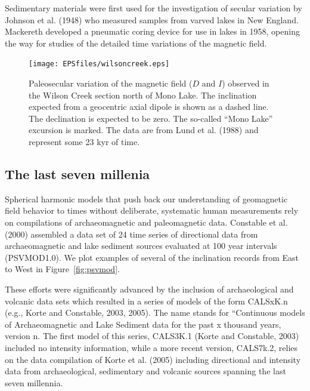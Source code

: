 Sedimentary materials were first used  for the investigation of secular variation   by  
Johnson et al. (1948) \nocite{johnson48} who measured samples from varved lakes in New England.   Mackereth developed a pneumatic coring device for use in  lakes in 1958, opening the way for studies of the detailed time variations of the magnetic field.  
 
\begin{figure}[htb]
\centering  \texttt{[image: EPSfiles/wilsoncreek.eps]}
\caption{ Paleosecular variation of the magnetic field ($D$ and $I$)
observed in the Wilson Creek section north of Mono Lake.  The inclination expected from a geocentric axial dipole is shown as a dashed line.  The declination is
expected to be zero.  The so-called ``Mono
 Lake'' excursion is
marked. The data are from
 Lund et al. (1988) and represent some 23 kyr of time. }
\label{fig:lund}
\end{figure} \nocite{lund88}



\subsection{The last seven millenia}  

Spherical harmonic models  that push back our understanding of geomagnetic field behavior to times without deliberate, systematic human measurements rely on compilations of archaeomagnetic and paleomagnetic data.  
Constable et al. (2000)  \nocite{constable00}
assembled a data set of 24 time series of directional data from archaeomagnetic and lake sediment sources evaluated at 100 year intervals 
(PSVMOD1.0). 
 We plot examples of several of the inclination records from East to West in Figure~\ref{fig:psvmod}.  

  These efforts were significantly advanced by the inclusion of archaeological and volcanic data sets which resulted in a series of models of the form 
  CALSxK.n  (e.g., Korte and Constable, 2003, 2005).  The name  stands for ``Continuous models of \nocite{korte05}
Archaeomagnetic and Lake Sediment data for the past
x thousand years, version n.     The first model of this series,  CALS3K.1 
(Korte and Constable, 2003) \nocite{korte03} included no intensity information, while a more recent version, CALS7k.2,  relies on the data compilation of 
Korte et al. (2005) \nocite{korte05b} including directional and intensity data from archaeological, sedimentary and volcanic sources spanning the last seven millennia.  

